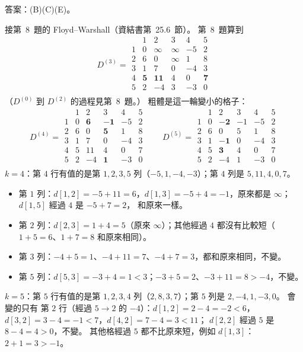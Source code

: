\begin{pastsoln}
答案：(B)(C)(E)。

接第~8~題的 Floyd--Warshall（資結書第~25.6~節）。 第~8~題算到
\[
D^{(3)} = \begin{array}{c|rrrrr}
 & 1 & 2 & 3 & 4 & 5 \\ \hline
1 & 0 & \infty & \infty & -5 & 2 \\
2 & 6 & 0 & \infty & 1 & 8 \\
3 & 1 & 7 & 0 & -4 & 3 \\
4 & \mathbf{5} & \mathbf{11} & 4 & 0 & \mathbf{7} \\
5 & 2 & -4 & 3 & -3 & 0 \\
\end{array}
\]
（$D^{(0)}$ 到 $D^{(2)}$ 的過程見第~8~題。） 粗體是這一輪變小的格子：
\[
D^{(4)} = \begin{array}{c|rrrrr}
 & 1 & 2 & 3 & 4 & 5 \\ \hline
1 & 0 & \mathbf{6} & \mathbf{-1} & -5 & 2 \\
2 & 6 & 0 & \mathbf{5} & 1 & 8 \\
3 & 1 & 7 & 0 & -4 & 3 \\
4 & 5 & 11 & 4 & 0 & 7 \\
5 & 2 & -4 & \mathbf{1} & -3 & 0 \\
\end{array}
\qquad
D^{(5)} = \begin{array}{c|rrrrr}
 & 1 & 2 & 3 & 4 & 5 \\ \hline
1 & 0 & \mathbf{-2} & -1 & -5 & 2 \\
2 & 6 & 0 & 5 & 1 & 8 \\
3 & 1 & \mathbf{-1} & 0 & -4 & 3 \\
4 & 5 & \mathbf{3} & 4 & 0 & 7 \\
5 & 2 & -4 & 1 & -3 & 0 \\
\end{array}
\]
\textbf{$k = 4$}：第 $4$ 行有值的是第 $1, 2, 3, 5$ 列（$-5, 1, -4, -3$）；第 $4$ 列是 $5, 11, 4, 0, 7$。
\begin{itemize}
\item 第 $1$ 列：$d[1,2] = -5 + 11 = 6$，$d[1,3] = -5 + 4 = -1$，原來都是 $\infty$；$d[1,5]$ 經過 $4$ 是 $-5 + 7 = 2$，
和原來一樣。
\item 第 $2$ 列：$d[2,3] = 1 + 4 = 5$（原來 $\infty$）；其他經過 $4$ 都沒有比較短（$1 + 5 = 6$、$1 + 7 = 8$ 和原來相同）。
\item 第 $3$ 列：$-4 + 5 = 1$、$-4 + 11 = 7$、$-4 + 7 = 3$，都和原來相同，不變。
\item 第 $5$ 列：$d[5,3] = -3 + 4 = 1 < 3$；$-3 + 5 = 2$、$-3 + 11 = 8 > -4$，不變。
\end{itemize}
\textbf{$k = 5$}：第 $5$ 行有值的是第 $1, 2, 3, 4$ 列（$2, 8, 3, 7$）；第 $5$ 列是 $2, -4, 1, -3, 0$。 會變的只有
第 $2$ 行（經過 $5 \to 2$ 的 $-4$）：$d[1,2] = 2 - 4 = -2 < 6$，$d[3,2] = 3 - 4 = -1 < 7$，$d[4,2] = 7 - 4 = 3 < 11$；
$d[2,2]$ 經過 $5$ 是 $8 - 4 = 4 > 0$，不變。 其他格經過 $5$ 都不比原來短，例如 $d[1,3]$：$2 + 1 = 3 > -1$。


\end{pastsoln}
